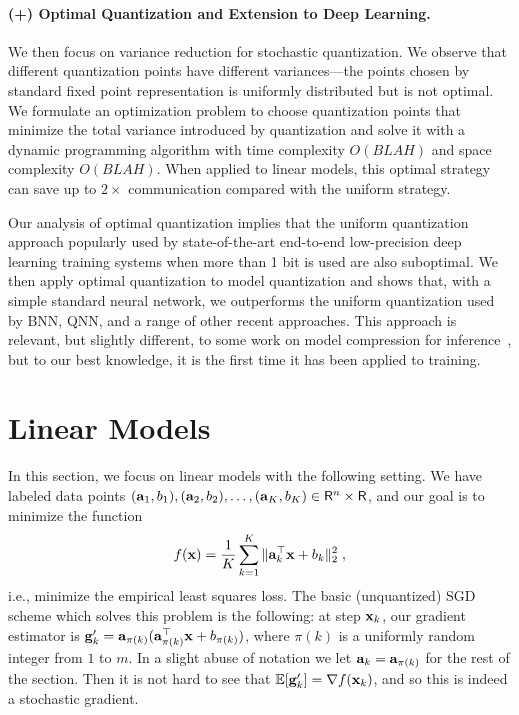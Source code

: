 \documentclass{article}
\newcommand{\R}{\mathsf{R}}
\def\a{{\bf a}}
\def\g{{\bf g}}
\def\x{{\bf x}}
\def\E{\mathbb{E}}
\begin{document}
\vspace{-1em}
\paragraph{(+) Optimal Quantization and Extension to Deep Learning.}
We then focus on variance reduction for 
stochastic quantization. We observe that different
quantization points have different variances---the points chosen
by standard fixed point representation is uniformly
distributed but is not optimal.
We formulate an optimization problem to choose 
quantization points that minimize the total variance
introduced by quantization and solve it with 
a dynamic programming algorithm with time complexity
$O(BLAH)$ and space complexity $O(BLAH)$.
When applied to linear models, this optimal 
strategy can save up to $2\times$ communication
compared with the uniform strategy.

Our analysis of optimal quantization 
implies that the uniform quantization approach
popularly used by state-of-the-art end-to-end
low-precision deep learning training systems
when more than 1 bit is used are also suboptimal.
We then apply optimal quantization to 
model quantization and shows that, with a simple
standard neural network, we outperforms the
uniform quantization used by BNN, QNN, and a
range of other recent approaches. This approach
is relevant, but slightly different, to some work 
on model compression for inference~\cite{XXX, YYY}, 
but to our best knowledge, it is the first time it 
has been applied to training. 


\section{Linear Models}

In this section, we focus on linear models with
the following setting.
We have labeled data points $(\a_1, b_1), (\a_2, b_2), \ldots, (\a_K, b_K) \in \R^n \times \R$, and our goal is to minimize the function
\[
f(\x) = \frac{1}{K} \sum_{k = 1}^K \| \a_k^\top \x + b_k \|_2^2 \; ,
\]
i.e., minimize the empirical least squares loss.
The basic (unquantized) SGD scheme which solves this problem is the following: at step $\x_k$, our gradient estimator is $\g'_k = \a_{\pi(k)} (\a_{\pi(k)}^\top \x + b_{\pi(k)})$, where $\pi(k)$ is a uniformly random integer from $1$ to $m$.
In a slight abuse of notation we let $\a_k = \a_{\pi(k)}$ for the rest of the section.
Then it is not hard to see that $\E [\g'_k] = \nabla f(\x_k)$, and so this is indeed a stochastic gradient.
\end{document}
